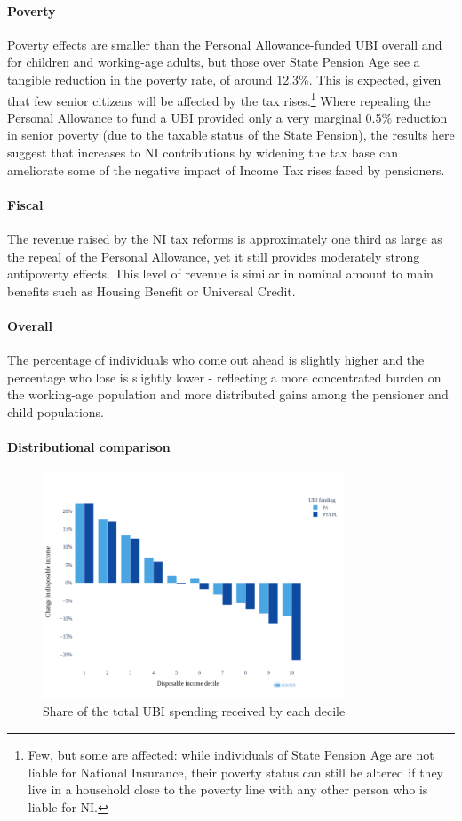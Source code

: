 \documentclass{article}
\begin{document}
    \paragraph{Poverty} Poverty effects are smaller than the Personal Allowance-funded UBI overall and for children and working-age adults, but those over State Pension Age see a tangible reduction in the poverty rate, of around 12.3\%. This is expected, given that few senior citizens will be affected by the tax rises.\footnote{Few, but some are affected: while individuals of State Pension Age are not liable for National Insurance, their poverty status can still be altered if they live in a household close to the poverty line with any other person who is liable for NI.} Where repealing the Personal Allowance to fund a UBI provided only a very marginal 0.5\% reduction in senior poverty (due to the taxable status of the State Pension), the results here suggest that increases to NI contributions by widening the tax base can ameliorate some of the negative impact of Income Tax rises faced by pensioners.
    \paragraph{Fiscal} The revenue raised by the NI tax reforms is approximately one third as large as the repeal of the Personal Allowance, yet it still provides moderately strong antipoverty effects. This level of revenue is similar in nominal amount to main benefits such as Housing Benefit or Universal Credit.
    \paragraph{Overall} The percentage of individuals who come out ahead is slightly higher and the percentage who lose is slightly lower - reflecting a more concentrated burden on the working-age population and more distributed gains among the pensioner and child populations.

    \paragraph{Distributional comparison}

    \begin{figure}
        \centering
        \includegraphics[width=0.8\textwidth]{images/fig_10.png}
        \caption{Share of the total UBI spending received by each decile}
        \label{fig:PA_NI_distr_comp}
    \end{figure}
\end{document}
